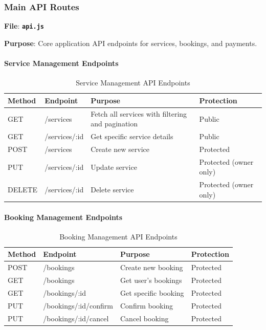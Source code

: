 \documentclass[12pt,a4paper]{article}
\newcommand{\file}[1]{\textbf{\texttt{#1}}}
\begin{document}
\subsubsection{Main API Routes}
\label{subsubsec:main-api-routes}

\textbf{File}: \file{api.js}

\textbf{Purpose}: Core application API endpoints for services, bookings, and payments.

\paragraph{Service Management Endpoints}
\begin{table}[H]
\centering
\small
\begin{tabular}{@{}llll@{}}
\toprule
\textbf{Method} & \textbf{Endpoint} & \textbf{Purpose} & \textbf{Protection} \\
\midrule
GET & /services & Fetch all services with filtering and pagination & Public \\
GET & /services/:id & Get specific service details & Public \\
POST & /services & Create new service & Protected \\
PUT & /services/:id & Update service & Protected (owner only) \\
DELETE & /services/:id & Delete service & Protected (owner only) \\
\bottomrule
\end{tabular}
\caption{Service Management API Endpoints}
\label{tab:service-endpoints}
\end{table}

\paragraph{Booking Management Endpoints}
\begin{table}[H]
\centering
\small
\begin{tabular}{@{}llll@{}}
\toprule
\textbf{Method} & \textbf{Endpoint} & \textbf{Purpose} & \textbf{Protection} \\
\midrule
POST & /bookings & Create new booking & Protected \\
GET & /bookings & Get user's bookings & Protected \\
GET & /bookings/:id & Get specific booking & Protected \\
PUT & /bookings/:id/confirm & Confirm booking & Protected \\
PUT & /bookings/:id/cancel & Cancel booking & Protected \\
\bottomrule
\end{tabular}
\caption{Booking Management API Endpoints}
\label{tab:booking-endpoints}
\end{table}
\end{document}
